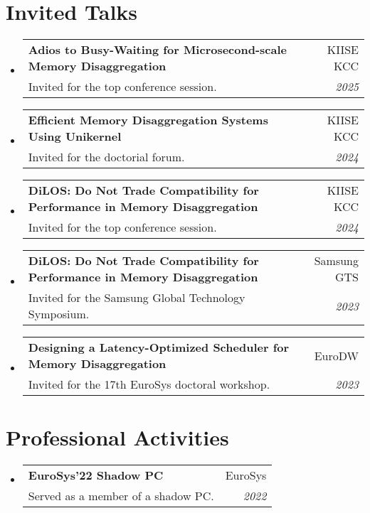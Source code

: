 \documentclass[letterpaper,11pt]{article}
\makeatletter
\newcommand{\resumeSubheading}[4]{
  \vspace{-1pt}\item
    \begin{tabular*}{0.97\textwidth}[t]{l@{\extracolsep{\fill}}r}
      \textbf{#1} & #2 \\
      {\small#3} & \textit{\small #4} \\
    \end{tabular*}\vspace{-5pt}
}
\newcommand{\resumeSubHeadingListStart}{\begin{itemize}[leftmargin=*]}
\newcommand{\resumeSubHeadingListEnd}{\end{itemize}}
\makeatother
\begin{document}
\section{Invited Talks}
\resumeSubHeadingListStart
\resumeSubheading{Adios to Busy-Waiting for Microsecond-scale Memory Disaggregation}{KIISE KCC}{Invited for the top conference session.}{2025}
\resumeSubheading{Efficient Memory Disaggregation Systems Using Unikernel}{KIISE KCC}{Invited for the doctorial forum.}{2024}
\resumeSubheading{DiLOS: Do Not Trade Compatibility for Performance in Memory Disaggregation}{KIISE KCC}{Invited for the top conference session.}{2024}
\resumeSubheading{DiLOS: Do Not Trade Compatibility for Performance in Memory Disaggregation}{Samsung GTS}{Invited for the Samsung Global Technology Symposium.}{2023}
\resumeSubheading{Designing a Latency-Optimized Scheduler for Memory Disaggregation}{EuroDW}{Invited for the 17th EuroSys doctoral workshop.}{2023}
\resumeSubHeadingListEnd

\section{Professional Activities}
\resumeSubHeadingListStart
\resumeSubheading{EuroSys'22 Shadow PC}{EuroSys}{Served as a member of a shadow PC.}{2022}
\resumeSubHeadingListEnd


\end{document}
